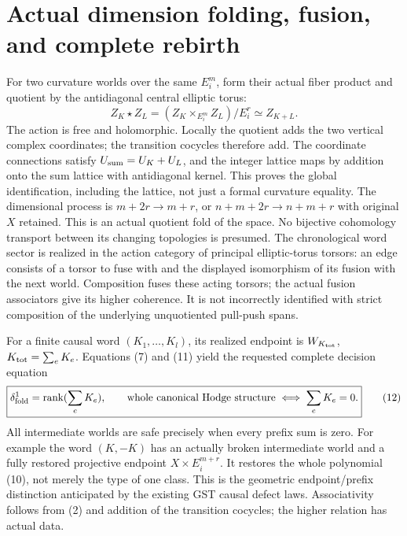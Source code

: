 \documentclass[11pt]{article}
\newcommand{\rank}{\operatorname{rank}}
\begin{document}
\section{Actual dimension folding, fusion, and complete rebirth}
For two curvature worlds over the same $E_i^m$, form their actual fiber
product and quotient by the antidiagonal central elliptic torus:
\[
 Z_K\star Z_L=(Z_K\times_{E_i^m}Z_L)/E_i^r\simeq Z_{K+L}.       \tag{11}
\]
The action is free and holomorphic. Locally the quotient adds the two
vertical complex coordinates; the transition cocycles therefore add.
The coordinate connections satisfy $U_{\rm sum}=U_K+U_L$, and the
integer lattice maps by addition onto the sum lattice with antidiagonal
kernel. This proves the global identification, including the lattice,
not just a formal curvature equality. The dimensional process is
$m+2r\to m+r$, or $n+m+2r\to n+m+r$ with original $X$ retained.
This is an actual quotient fold of the space. No bijective cohomology
transport between its changing topologies is presumed.
The chronological word sector is realized in the action category of
principal elliptic-torus torsors: an edge consists of a torsor to fuse with
and the displayed isomorphism of its fusion with the next world.
Composition fuses these acting torsors; the actual fusion associators
give its higher coherence. It is not incorrectly identified with strict
composition of the underlying unquotiented pull-push spans.

For a finite causal word $(K_1,\ldots,K_l)$, its realized endpoint is
$W_{K_{\rm tot}}$, $K_{\rm tot}=\sum_eK_e$. Equations (7) and (11) yield
the requested complete decision equation
\[
 \boxed{\delta^1_{\rm fold}=\rank(\sum_eK_e),\qquad
 \text{whole canonical Hodge structure}\iff\sum_eK_e=0.}        \tag{12}
\]
All intermediate worlds are safe precisely when every prefix sum is zero.
For example the word $(K,-K)$ has an actually broken intermediate world
and a fully restored projective endpoint $X\times E_i^{m+r}$.
It restores the whole polynomial (10), not merely the type of one class.
This is the geometric endpoint/prefix distinction anticipated by the
existing GST causal defect laws. Associativity follows from (2) and
addition of the transition cocycles; the higher relation has actual data.
\end{document}
